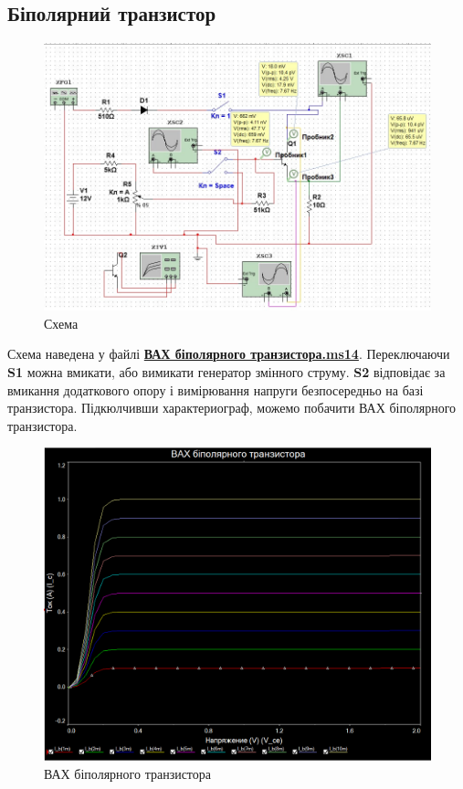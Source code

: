 \documentclass[
  ukrainian,
  14pt
]{extreport}
\begin{document}
\subsection{Біполярний транзистор}
\begin{figure}[H]
    \centering
    \includegraphics[width=.7\textwidth]{imgs/b-1.png}
    \caption{Схема}
\end{figure}
Схема наведена у файлі \textbf{\underline{ВАХ біполярного транзистора.ms14}}.
Переключаючи \textbf{S1} можна вмикати, або вимикати генератор змінного струму. \textbf{S2} відповідає за вмикання додаткового опору і вимірювання напруги безпосередньо на базі транзистора. Підкюлчивши характериограф, можемо побачити ВАХ біполярного транзистора.
\begin{figure}[H]
    \centering
    \includegraphics[width=.7\textwidth]{imgs/b-5.png}
    \caption{ВАХ біполярного транзистора}
\end{figure}
\end{document}
